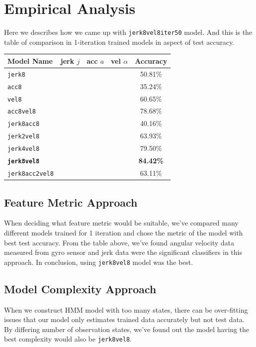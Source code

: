 \documentclass[10pt,twocolumn,letterpaper]{article}
\newcommand*\OK{\checkmark}
\newcommand*\BOLDOK{\ding{51}}
\begin{document}
\section{Empirical Analysis}

Here we describes how we came up with \texttt{jerk8vel8iter50} model. And this is the table of comparison in 1-iteration trained models in aspect of test accuracy.

{\centering
\begin{tabular}{ p{3cm}| ccc | c}
 \hline
 Model Name & jerk $j$ & acc $a$ & vel $\alpha$ & Accuracy \\
 \hline
 \texttt{jerk8} & \OK & & & 50.81\% \\
 \texttt{acc8} & & \OK & & 35.24\% \\
 \texttt{vel8} & & & \OK & 60.65\% \\
 \texttt{acc8vel8} & & \OK & \OK & 78.68\% \\
 \texttt{jerk8acc8} & \OK & \OK & & 40.16\% \\
 \texttt{jerk2vel8} & \OK & & \OK & 63.93\% \\
 \texttt{jerk4vel8} & \OK & & \OK & 79.50\% \\
 \texttt{\textbf{jerk8vel8}} & \BOLDOK & & \BOLDOK & \textbf{84.42\%} \\
 \texttt{jerk8acc2vel8} & \OK & \OK & \OK & 63.11\% \\
 \hline
\end{tabular}
}

\subsection{Feature Metric Approach}
When deciding what feature metric would be suitable, we've compared many different models trained for 1 iteration and chose the metric of the model with best test accuracy. From the table above, we've found angular velocity data measured from gyro sensor and jerk data were the significant classifiers in this approach. In conclusion, using \texttt{jerk8vel8} model was the best.

\subsection{Model Complexity Approach}
When we construct HMM model with too many states, there can be over-fitting issues that our model only estimates trained data accurately but not test data. By differing number of observation states, we've found out the model having the best complexity would also be \texttt{jerk8vel8}.
\end{document}
